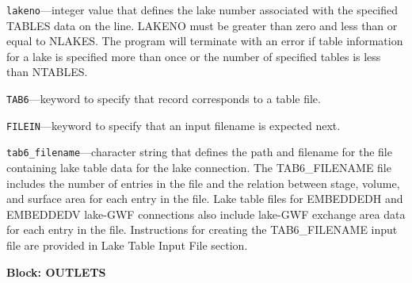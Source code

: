 \begin{description}
\item \texttt{lakeno}---integer value that defines the lake number associated with the specified TABLES data on the line. LAKENO must be greater than zero and less than or equal to NLAKES. The program will terminate with an error if table information for a lake is specified more than once or the number of specified tables is less than NTABLES.

\item \texttt{TAB6}---keyword to specify that record corresponds to a table file.

\item \texttt{FILEIN}---keyword to specify that an input filename is expected next.

\item \texttt{tab6\_filename}---character string that defines the path and filename for the file containing lake table data for the lake connection. The TAB6\_FILENAME file includes the number of entries in the file and the relation between stage, volume, and surface area for each entry in the file. Lake table files for EMBEDDEDH and EMBEDDEDV lake-GWF connections also include lake-GWF exchange area data for each entry in the file. Instructions for creating the TAB6\_FILENAME input file are provided in Lake Table Input File section.

\end{description}
\item \textbf{Block: OUTLETS}

